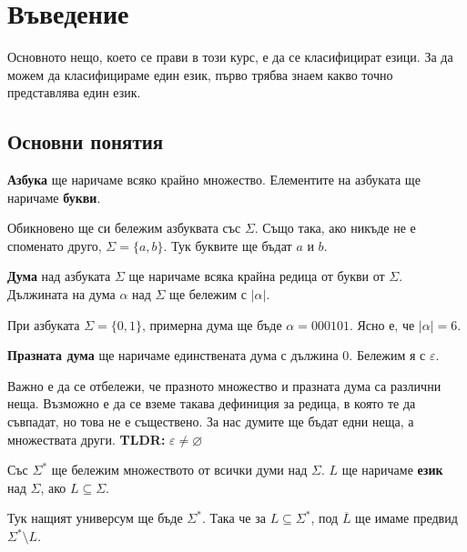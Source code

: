 \chapter{Въведение}

Основното нещо, което се прави в този курс, е да се класифицират езици.
За да можем да класифицираме един език, първо трябва знаем какво точно представлява един език.

\section{Основни понятия}

\begin{definition}
    \textbf{Азбука} ще наричаме всяко крайно множество.
    Елементите на азбуката ще наричаме \textbf{букви}.
\end{definition}

Обикновено ще си бележим азбуквата със $\Sigma$.
Също така, ако никъде не е споменато друго, $\Sigma = \{a, b \}$.
Тук буквите ще бъдат $a$ и $b$.

\begin{definition}
    \textbf{Дума} над азбуката $\Sigma$ ще наричаме всяка крайна редица от букви от $\Sigma$.
    Дължината на дума $\alpha$ над $\Sigma$ ще бележим с $|\alpha|$.
\end{definition}

При азбуката $\Sigma = \{0, 1\}$, примерна дума ще бъде $\alpha = 000101$.
Ясно е, че $|\alpha| = 6$.

\begin{definition}
    \textbf{Празната дума} ще наричаме единствената дума с дължина 0.
    Бележим я с $\varepsilon$.
\end{definition}

\begin{remark}
    Важно е да се отбележи, че празното множество и празната дума са различни неща.
    Възможно е да се вземе такава дефиниция за редица, в която те да съвпадат, но това не е съществено.
    За нас думите ще бъдат едни неща, а множествата други.
    \textbf{TLDR:} $\varepsilon \neq \varnothing$
\end{remark}

\begin{definition}
    Със $\Sigma^*$ ще бележим множеството от всички думи над $\Sigma$.
    $L$ ще наричаме \textbf{език} над $\Sigma$, ако $L \subseteq \Sigma$.
\end{definition}

Тук нащият универсум ще бъде $\Sigma^*$.
Така че за $L \subseteq \Sigma^*$, под $\overline{L}$ ще имаме предвид $\Sigma^* \setminus L$.


